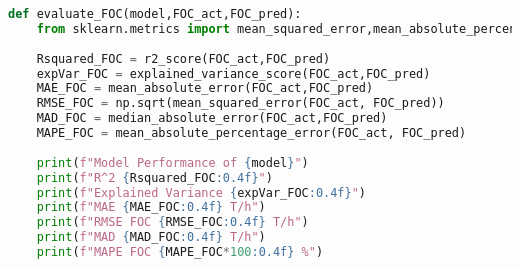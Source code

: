 \begin{lstlisting}[language=Python]
def evaluate_FOC(model,FOC_act,FOC_pred):
    from sklearn.metrics import mean_squared_error,mean_absolute_percentage_error,r2_score,explained_variance_score,median_absolute_error,mean_absolute_error
    
    Rsquared_FOC = r2_score(FOC_act,FOC_pred)
    expVar_FOC = explained_variance_score(FOC_act,FOC_pred)
    MAE_FOC = mean_absolute_error(FOC_act,FOC_pred)
    RMSE_FOC = np.sqrt(mean_squared_error(FOC_act, FOC_pred))
    MAD_FOC = median_absolute_error(FOC_act,FOC_pred)
    MAPE_FOC = mean_absolute_percentage_error(FOC_act, FOC_pred)
    
    print(f"Model Performance of {model}")
    print(f"R^2 {Rsquared_FOC:0.4f}")
    print(f"Explained Variance {expVar_FOC:0.4f}")
    print(f"MAE {MAE_FOC:0.4f} T/h")    
    print(f"RMSE FOC {RMSE_FOC:0.4f} T/h")
    print(f"MAD {MAD_FOC:0.4f} T/h")    
    print(f"MAPE FOC {MAPE_FOC*100:0.4f} %")
\end{lstlisting}